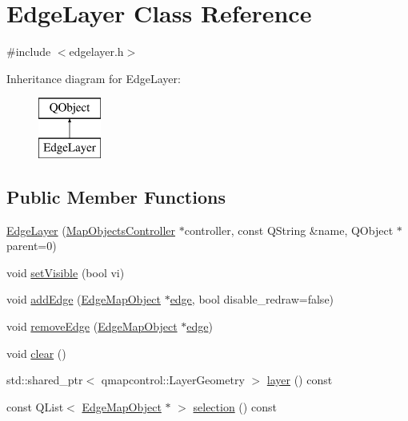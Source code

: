 \hypertarget{class_edge_layer}{}\section{Edge\+Layer Class Reference}
\label{class_edge_layer}


{\ttfamily \#include $<$edgelayer.\+h$>$}

Inheritance diagram for Edge\+Layer\+:\begin{figure}[H]
\begin{center}
\leavevmode
\includegraphics[height=2.000000cm]{d9/d9a/class_edge_layer}
\end{center}
\end{figure}
\subsection*{Public Member Functions}
\begin{DoxyCompactItemize}
\item 
\mbox{\hyperlink{class_edge_layer_acca0dfa633a088706a345989706d393b}{Edge\+Layer}} (\mbox{\hyperlink{class_map_objects_controller}{Map\+Objects\+Controller}} $\ast$controller, const Q\+String \&name, Q\+Object $\ast$parent=0)
\item 
void \mbox{\hyperlink{class_edge_layer_ae39ae5f22c968da3cd3ee9c46f23445a}{set\+Visible}} (bool vi)
\item 
void \mbox{\hyperlink{class_edge_layer_af93684a3bab8c30d7e1217dea684e482}{add\+Edge}} (\mbox{\hyperlink{class_edge_map_object}{Edge\+Map\+Object}} $\ast$\mbox{\hyperlink{structedge}{edge}}, bool disable\+\_\+redraw=false)
\item 
void \mbox{\hyperlink{class_edge_layer_a1deb9a1fb86ee4a110a1db31b75f9eec}{remove\+Edge}} (\mbox{\hyperlink{class_edge_map_object}{Edge\+Map\+Object}} $\ast$\mbox{\hyperlink{structedge}{edge}})
\item 
void \mbox{\hyperlink{class_edge_layer_a197118a7833836e192db17cfb34930a5}{clear}} ()
\item 
std\+::shared\+\_\+ptr$<$ qmapcontrol\+::\+Layer\+Geometry $>$ \mbox{\hyperlink{class_edge_layer_a6e02228b0ad8714991aa496d26064a44}{layer}} () const
\item 
const Q\+List$<$ \mbox{\hyperlink{class_edge_map_object}{Edge\+Map\+Object}} $\ast$ $>$ \mbox{\hyperlink{class_edge_layer_a03a5e20611e50c658094e6c75094e857}{selection}} () const
\end{DoxyCompactItemize}


